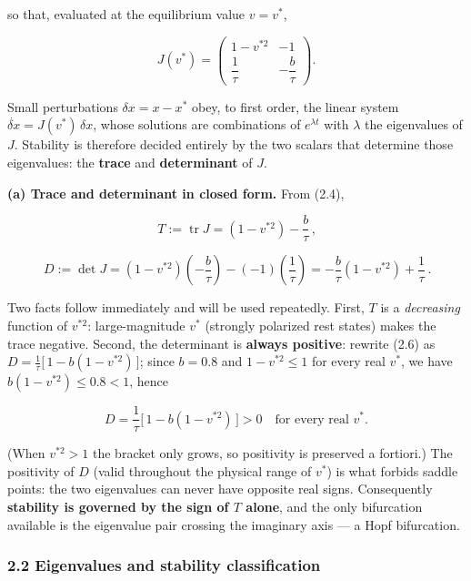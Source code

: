 \documentclass[
  11pt,
]{article}
\providecommand{\lt}{<}
\providecommand{\gt}{>}
\begin{document}
so that, evaluated at the equilibrium value \(v = v^*\),

\[
J(v^*) =
\begin{pmatrix}
1 - v^{*2} & -1 \\[2pt]
\dfrac{1}{\tau} & -\dfrac{b}{\tau}
\end{pmatrix}.
\tag{2.4}
\]

Small perturbations \(\delta x = x - x^*\) obey, to first order, the
linear system \(\dot{\delta x} = J(v^*)\,\delta x\), whose solutions are
combinations of \(e^{\lambda t}\) with \(\lambda\) the eigenvalues of
\(J\). Stability is therefore decided entirely by the two scalars that
determine those eigenvalues: the \textbf{trace} and \textbf{determinant}
of \(J\).

\textbf{(a) Trace and determinant in closed form.} From (2.4),

\[
\boxed{\,T := \operatorname{tr} J = (1 - v^{*2}) - \frac{b}{\tau}\,},
\tag{2.5}
\]

\[
\boxed{\,D := \det J = (1 - v^{*2})\!\left(-\frac{b}{\tau}\right) - (-1)\!\left(\frac{1}{\tau}\right)
= -\frac{b}{\tau}(1 - v^{*2}) + \frac{1}{\tau}\,}.
\tag{2.6}
\]

Two facts follow immediately and will be used repeatedly. First, \(T\)
is a \emph{decreasing} function of \(v^{*2}\): large-magnitude \(v^*\)
(strongly polarized rest states) makes the trace negative. Second, the
determinant is \textbf{always positive}: rewrite (2.6) as
\(D = \tfrac{1}{\tau}\big[\,1 - b(1 - v^{*2})\,\big]\); since
\(b = 0.8\) and \(1 - v^{*2} \le 1\) for every real \(v^*\), we have
\(b(1 - v^{*2}) \le 0.8 \lt  1\), hence

\[
D = \frac{1}{\tau}\big[\,1 - b(1 - v^{*2})\,\big] \gt  0 \quad \text{for every real } v^*.
\tag{2.7}
\]

(When \(v^{*2} \gt  1\) the bracket only grows, so positivity is
preserved a fortiori.) The positivity of \(D\) (valid throughout the
physical range of \(v^*\)) is what forbids saddle points: the two
eigenvalues can never have opposite real signs. Consequently
\textbf{stability is governed by the sign of \(T\) alone}, and the only
bifurcation available is the eigenvalue pair crossing the imaginary axis
--- a Hopf bifurcation.

\subsubsection{2.2 Eigenvalues and stability
classification}\label{eigenvalues-and-stability-classification}
\end{document}
